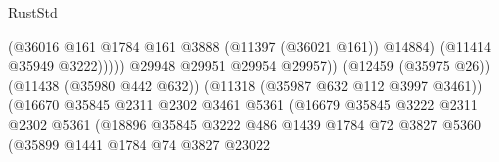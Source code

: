 \begin{lexlean}{RustStd}
\begin{coremodule}
                                                            (@36016
                                                              @161
                                                              @1784
                                                              @161
                                                              @3888
                                                              (@11397 (@36021 @161))
                                                              @14884)
                                                            (@11414 @35949 @3222)))))
                                                    @29948
                                                    @29951
                                                    @29954
                                                    @29957))
                                                (@12459 (@35975 @26))
                                                (@11438 (@35980 @442 @632))
                                                (@11318 (@35987 @632 @112 @3997 @3461))
                                                (@16670
                                                  @35845
                                                  @2311
                                                  @2302
                                                  @3461
                                                  @5361
                                                  (@16679
                                                    @35845
                                                    @3222
                                                    @2311
                                                    @2302
                                                    @5361
                                                    (@18896
                                                      @35845
                                                      @3222
                                                      @486
                                                      @1439
                                                      @1784
                                                      @72
                                                      @3827
                                                      @5360
                                                      (@35899
                                                        @1441
                                                        @1784
                                                        @74
                                                        @3827
                                                        @23022

\end{coremodule}
\end{lexlean}
